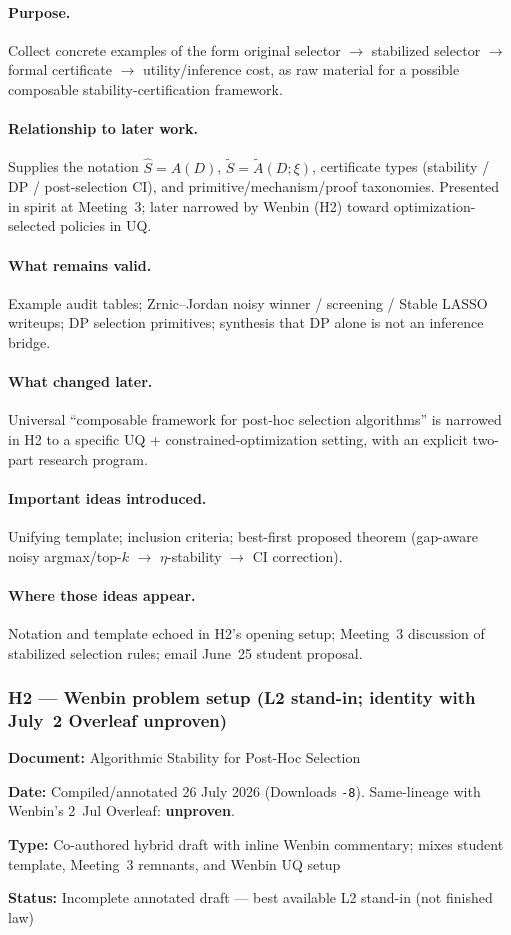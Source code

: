 \documentclass[11pt]{article}
\newcommand{\Status}[1]{\textbf{Status:} #1}
\newcommand{\Meta}[2]{\par\noindent\textbf{#1:} #2\par}
\begin{document}
\paragraph{Purpose.}
Collect concrete examples of the form
original selector $\to$ stabilized selector $\to$ formal certificate $\to$ utility/inference cost,
as raw material for a possible composable stability-certification framework.

\paragraph{Relationship to later work.}
Supplies the notation $\hat S=A(D)$, $\tilde S=\tilde A(D;\xi)$, certificate types
(stability / DP / post-selection CI), and primitive/mechanism/proof taxonomies. Presented in
spirit at Meeting~3; later narrowed by Wenbin (H2) toward optimization-selected policies in UQ.

\paragraph{What remains valid.}
Example audit tables; Zrnic--Jordan noisy winner / screening / Stable LASSO writeups;
DP selection primitives; synthesis that DP alone is not an inference bridge.

\paragraph{What changed later.}
Universal ``composable framework for post-hoc selection algorithms'' is narrowed in H2 to a
specific UQ + constrained-optimization setting, with an explicit two-part research program.

\paragraph{Important ideas introduced.}
Unifying template; inclusion criteria; best-first proposed theorem (gap-aware noisy
argmax/top-$k$ $\to$ $\eta$-stability $\to$ CI correction).

\paragraph{Where those ideas appear.}
Notation and template echoed in H2's opening setup; Meeting~3 discussion of stabilized
selection rules; email June~25 student proposal.

\subsubsection*{H2 --- Wenbin problem setup (L2 stand-in; identity with July~2 Overleaf unproven)}
\Meta{Document}{Algorithmic Stability for Post-Hoc Selection}
\Meta{Date}{Compiled/annotated 26 July 2026 (Downloads \texttt{-8}).
Same-lineage with Wenbin's 2~Jul Overleaf: \textbf{unproven}.}
\Meta{Type}{Co-authored hybrid draft with inline Wenbin commentary;
mixes student template, Meeting~3 remnants, and Wenbin UQ setup}
\Status{Incomplete annotated draft --- best available L2 stand-in (not finished law)}
\end{document}
